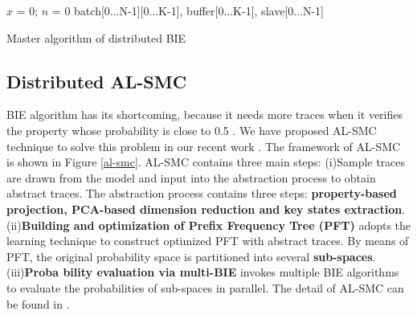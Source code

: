 \begin{algorithm}[t]
{}
$x$ = 0; $n$ = 0\;
batch[0...N-1][0...K-1], buffer[0...K-1], slave[0...N-1]\;
\caption{Master algorithm of distributed BIE}
\label{alg:dbeam}
\end{algorithm}


\subsection{Distributed AL-SMC}
BIE algorithm has its shortcoming, because it needs more traces when it verifies the property whose probability is close to 0.5 \cite{zuliani2013bayesian}. We have proposed AL-SMC technique to solve this problem in our recent work \cite{jiangkaiqiang2016}. The framework of AL-SMC is shown in Figure \ref{al-smc}. AL-SMC contains three main steps: (i)Sample traces are drawn from the model and input into the abstraction process to obtain abstract traces. The abstraction process contains three steps: \textbf{property-based projection, PCA-based dimension reduction \cite{dunteman1989principal} and key states extraction}. (ii)\textbf{Building and optimization of Prefix Frequency Tree (PFT)} adopts the learning technique \cite{carrasco1994learning} to construct optimized PFT with abstract traces. By means of PFT, the original probability space is partitioned into several \textbf{sub-spaces}. (iii)\textbf{Proba
bility evaluation via multi-BIE} invokes multiple BIE algorithms to evaluate the probabilities of sub-spaces in parallel. The detail of AL-SMC can be found in \cite{jiangkaiqiang2016}.

